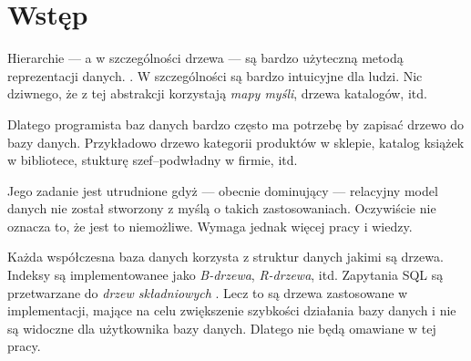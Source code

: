\chapter*{Wstęp}






Hierarchie --- a w szczególności drzewa --- są bardzo użyteczną metodą reprezentacji danych. . 
W szczególności są bardzo intuicyjne dla ludzi.
Nic dziwnego, że z tej abstrakcji korzystają \emph{mapy myśli}, drzewa katalogów, itd.

Dlatego programista baz danych bardzo często ma potrzebę by zapisać drzewo do bazy danych.
Przykładowo drzewo kategorii produktów w sklepie, katalog książek w bibliotece, stukturę szef--podwładny w firmie, itd.

Jego zadanie jest utrudnione gdyż --- obecnie dominujący --- relacyjny model danych nie został stworzony z myślą o takich zastosowaniach.
Oczywiście nie oznacza to, że jest to niemożliwe.
Wymaga jednak więcej pracy i wiedzy.






Każda współczesna baza danych korzysta z struktur danych jakimi są drzewa. 
Indeksy są implementowanee jako \emph{B-drzewa}, \emph{R-drzewa}, itd.
Zapytania SQL są przetwarzane do \emph{drzew składniowych} .
Lecz to są drzewa zastosowane w implementacji, mające na celu zwiększenie szybkości działania bazy danych i nie są widoczne dla użytkownika bazy danych.
Dlatego nie będą omawiane w tej pracy.




